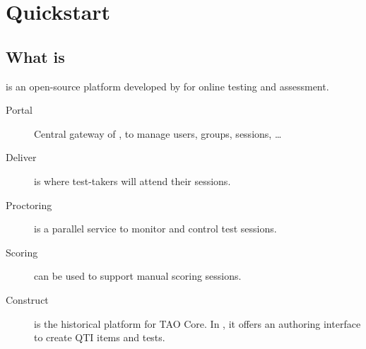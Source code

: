 \section{Quickstart}
\subsection{What is \taoce}
\begin{frame}
    \taoce is an open-source platform developed by \OATSA for online testing and assessment.
\pause
    \begin{description}
        \item[Portal] Central gateway of \taoce, to manage users, groups, sessions, \dots
        \pause
        \item[Deliver]  is where test-takers will attend their sessions.
        \pause
        \item[Proctoring]  is a parallel service to monitor and control test sessions.
        \pause
        \item[Scoring]  can be used to support manual scoring sessions.
        \pause
        \item[Construct]  is the historical platform for TAO Core. In \taoce, it offers an authoring interface to create QTI items and tests. 
    \end{description}
\end{frame}
